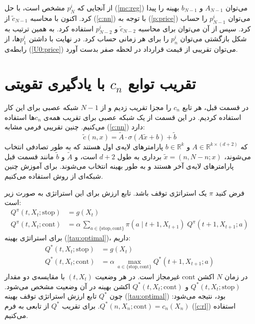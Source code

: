 \documentclass[hidelinks, 11pt]{article}
\begin{document}
از آنجایی که \(p_{N}^{i}\) مشخص است، با حل (\ref{mc:reg}) می‌توان
\(A_{N-1}\) و \(b_{N-1}\) بهینه را پیدا کرد.  اکنون با محاسبه
\(\widetilde{c}_{N-1}\) از (\ref{c:nn}) با توجه به (\ref{p:price})
می‌توان \(p_{N-1}^{i}\) را حساب کرد.  سپس از آن می‌توان برای محاسبه
\(\widetilde{c}_{N-2}\) و \(p_{N-2}^{i}\) استفاده کرد.  به همین ترتیب به
شکل بازگشتی می‌توان \(p_{n}^{i}\) را برای هر زمانی حساب کرد.  در نهایت با
داشتن \(p_{1}^{i}\)ها، از رابطه‌ی (\ref{U0:price}) می‌توان تقریبی از قیمت
قرارداد در لحظه صفر بدست آورد.

\section{تقریب توابع \(c_{n}\) با یادگیری تقویتی}
\label{sec:orge1595a7}

در قسمت قبل، هر تابع \(c_{n}\) را مجزا تقریب زدیم و از \(N-1\) شبکه عصبی
برای این کار استفاده کردیم.  در این قسمت از یک شبکه عصبی برای تقریب همه‌ی
\(c_{n}\)ها استفاده می‌کنیم.  چنین تقریبی فرمی مشابه (\ref{c:nn}) دارد:
\begin{equation}
	\label{c:rl}
	\widetilde{c}(n,x) =
	   \widetilde{A} \cdot \sigma (A\widetilde{x}+b) + \widetilde{b}
\end{equation}
که \(A\in\mathbb{R}^{k\times(d+2)}\) و \(b\in\mathbb{R}^{k}\) پارامترهای
لایه‌ی اول هستند که به طور تصادفی انتخاب می‌شوند،
\(\widetilde{x}=(n,N-n;x)\) برداری به طول \(d+2\) است، و
\(\widetilde{A}\) و \(\widetilde{b}\) مانند قسمت قبل پارامترهای لایه‌ی
آخر هستند و به طور بهینه انتخاب می‌شوند.  برای آموزش چنین شبکه‌ای از روش
 استفاده می‌کنیم.

فرض کنید \(\pi\) یک استراتژی توقف باشد.  تابع ارزش برای این استراتژی به
صورت زیر است:
\begin{align*}
  Q^{\pi}(t, X_{t};\text{stop})
  &= g(X_{t}) \\
  Q^{\pi}(t, X_{t};\text{cont})
  &= \alpha\, \sum_{a\in\{\text{stop},\text{cont}\}}
      \pi(a\mid t+1,X_{t+1})\; Q^{\pi}(t+1,X_{t+1};a)
\end{align*}
برای استراتژی بهینه (\ref{tau:optimal})، داریم:
\begin{align}
  \label{Q:optimal}
  Q^{\ast}(t, X_{t};\text{stop})
  &= g(X_{t}) \nonumber \\
  Q^{\ast}(t, X_{t};\text{cont})
  &= \alpha\, \max_{a\in\{\text{stop},\text{cont}\}}Q^{\ast}(t+1,X_{t+1};a)
\end{align}
در زمان \(N\) اکشن \(\text{cont}\) غیرمجاز است.  در هر وضعیت
\((t,X_{t})\)
 با مقایسه‌ی دو مقدار \(Q^{\ast}(t, X_{t};\text{stop})\) و
\(Q^{\ast}(t, X_{t};\text{cont})\) اکشن بهینه در آن وضعیت مشخص می‌شود.
چون \(Q^{\ast}\) تابع ارزش استراتژی توقف بهینه (\ref{tau:optimal}) بود،
نتیجه می‌شود: \(Q^{\ast}(n,X_{n};\text{cont})=c_{n}(X_{n})\).  برای تقریب
\(Q^{\ast}\) از تابعی به فرم (\ref{c:rl}) استفاده می‌کنیم.
\end{document}
